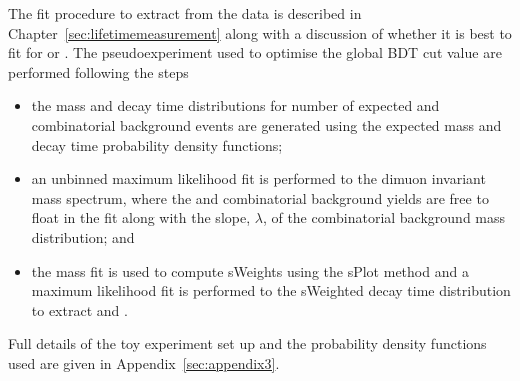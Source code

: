 The fit procedure to extract \tmumu from the data is described in Chapter~\ref{sec:lifetimemeasurement} along with a discussion of whether it is best to fit for \tmumu or \invtmumu. The pseudoexperiment used to optimise the global BDT cut value are performed following the steps
\begin{itemize}
\item the mass and decay time distributions for number of expected \bsmumu and combinatorial background events are generated using the expected mass and decay time probability density functions;
\item an unbinned maximum likelihood fit is performed to the dimuon invariant mass spectrum, where the \bsmumu and combinatorial background yields are free to float in the fit along with the slope, $\lambda$, of the combinatorial background mass distribution; and 
\item the mass fit is used to compute sWeights using the sPlot method \cite{Pivk:2004ty} and a maximum likelihood fit is performed to the sWeighted decay time distribution to extract \tmumu and \invtmumu. 
\end{itemize}
Full details of the toy experiment set up and the probability density functions used are given in Appendix~\ref{sec:appendix3}. 

